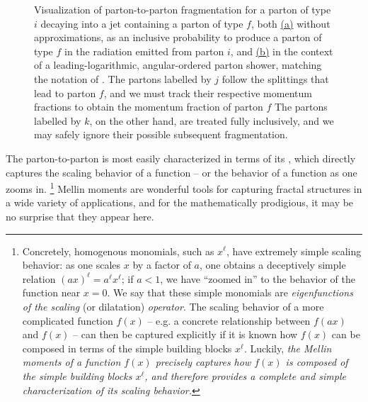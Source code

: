 \begin{figure}[t!]
    \centering

    \caption[Visualization of parton-to-parton fragmentation for a parton of type \(i\) decaying into a jet containing a parton of type \(f\).]
    {
        Visualization of parton-to-parton fragmentation for a parton of type \(i\) decaying into a jet containing a parton of type \(f\), both
        \hyperref[fig:shower:cartoon:fragmentation1]{(a)}
        without approximations, as an inclusive probability to produce a parton of type \(f\) in the radiation emitted from parton \(i\), and
        \hyperref[fig:shower:cartoon:fragmentation2]{(b)}
        in the context of a leading-logarithmic, angular-ordered parton shower, matching the notation of .
        The partons labelled by \(j\) follow the splittings that lead to parton \(f\), and we must track their respective momentum fractions to obtain the momentum fraction of parton \(f\)
        The partons labelled by \(k\), on the other hand, are treated fully inclusively, and we may safely ignore their possible subsequent fragmentation.
    }

    \label{fig:shower:cartoon:fragmentation}
\end{figure}


The \gls{parton-to-parton} is most easily characterized in terms of its , which directly captures the scaling behavior of a function -- or the behavior of a function as one zooms in.%
\footnote{
    Concretely, homogenous monomials, such as \(x^\ell\), have extremely simple scaling behavior:
    as one scales \(x\) by a factor of \(a\), one obtains a deceptively simple relation \((a x)^\ell = a^\ell x^\ell\);
    if \(a < 1\), we have ``zoomed in'' to the behavior of the function near \(x = 0\).
    We say that these simple monomials are \textit{eigenfunctions of the scaling} (or dilatation) \textit{operator}.
    The scaling behavior of a more complicated function \(f(x)\) -- e.g. a concrete relationship between \(f(ax)\) and \(f(x)\) -- can then be captured explicitly if it is known how \(f(x)\) can be composed in terms of the simple building blocks \(x^\ell\).
    Luckily, \textit{the Mellin moments of a function \(f(x)\) precisely captures how \(f(x)\) is composed of the simple building blocks \(x^\ell\), and therefore provides a complete and simple characterization of its scaling behavior.}
}
%
Mellin moments are wonderful tools for capturing fractal structures in a wide variety of applications, and for the mathematically prodigious, it may be no surprise that they appear here.


